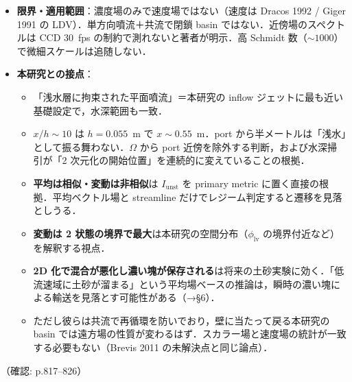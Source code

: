 \documentclass[11pt]{jsarticle}
\begin{document}
\begin{itemize}
\begin{itemize}
    \item スペクトルは $x/h = 33.6$ の $-5/3$ から $92.8$ の $-3$ へ遷移．自己相関は下流ほど周期が長い（渦の合体）．
  \end{itemize}
  \item \textbf{限界・適用範囲}：濃度場のみで速度場ではない（速度は Dracos 1992 / Giger 1991 の LDV）．単方向噴流＋共流で閉鎖 basin ではない．近傍場のスペクトルは CCD 30~fps の制約で測れないと著者が明示．高 Schmidt 数（$\sim 1000$）で微細スケールは追随しない．
  \item \textbf{本研究との接点}：
  \begin{itemize}
    \item 「浅水層に拘束された平面噴流」＝本研究の inflow ジェットに最も近い基礎設定で，水深範囲も一致．
    \item \textbf{$x/h \sim 10$} は $h = 0.055$~m で $x \sim 0.55$~m．port から半メートルは「浅水」として振る舞わない．$\Omega$ から port 近傍を除外する判断，および水深掃引が「2 次元化の開始位置」を連続的に変えていることの根拠．
    \item \textbf{平均は相似・変動は非相似}は $I_\mathrm{unst}$ を primary metric に置く直接の根拠．平均ベクトル場と streamline だけでレジーム判定すると遷移を見落としうる．
    \item \textbf{変動は 2 状態の境界で最大}は本研究の空間分布（$\phi_\mathrm{lv}$ の境界付近など）を解釈する視点．
    \item \textbf{2D 化で混合が悪化し濃い塊が保存される}は将来の土砂実験に効く．「低流速域に土砂が溜まる」という平均場ベースの推論は，瞬時の濃い塊による輸送を見落とす可能性がある（→§6）．
    \item ただし彼らは共流で再循環を防いでおり，壁に当たって戻る本研究の basin では遠方場の性質が変わるはず．スカラー場と速度場の統計が一致する必要もない（Brevis 2011 の未解決点と同じ論点）．
  \end{itemize}
\end{itemize}
\noindent（確認: p.817--826）
\end{document}
